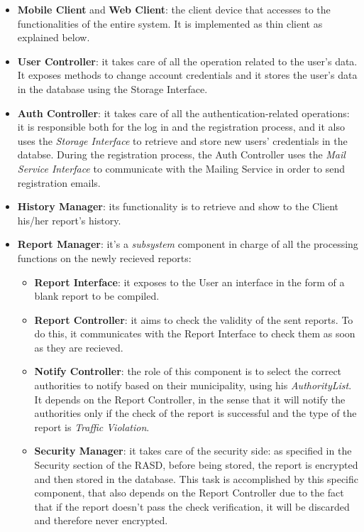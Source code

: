 \documentclass{report}
\begin{document}
\begin{itemize}
\item \textbf{Mobile Client} and \textbf{Web Client}: the client device that accesses to the functionalities of the entire system. It is implemented as thin client as explained below.

\item \textbf{User Controller}: it takes care of all the operation related to the user's data. It exposes methods to change account credentials and it stores the user's data in the database using the Storage Interface.
\item \textbf{Auth Controller}: it takes care of all the authentication-related operations: it is responsible both for the log in and the registration process, and it also uses the \textit{Storage Interface} to retrieve and store new users' credentials in the databse. During the registration process, the Auth Controller uses the \textit{Mail Service Interface} to communicate with the Mailing Service in order to send registration emails.
\item \textbf{History Manager}: its functionality is to retrieve and show to the Client his/her report's history.
\item \textbf{Report Manager}: it's a \textit{subsystem} component in charge of all the processing functions on the newly recieved reports:
\begin{itemize}
    \item \textbf{Report Interface}: it exposes to the User an interface in the form of a blank report to be compiled.
    \item \textbf{Report Controller}: it aims to check the validity of the sent reports. To do this, it communicates with the Report Interface to check them as soon as they are recieved.
    \item \textbf{Notify Controller}: the role of this component is to select the correct authorities to notify based on their municipality, using his \textit{AuthorityList}. It depends on the Report Controller, in the sense that it will notify the authorities only if the check of the report is successful and the type of the report is \textit{Traffic Violation}.
    \item \textbf{Security Manager}: it takes care of the security side: as specified in the Security section of the RASD, before being stored, the report is encrypted and then stored in the database. This task is accomplished by this specific component, that also depends on the Report Controller due to the fact that if the report doesn't pass the check verification, it will be discarded and therefore never encrypted.

\end{itemize}
\end{itemize}
\end{document}
